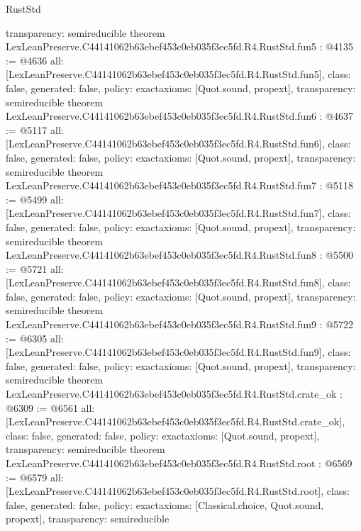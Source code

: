 \begin{lexlean}{RustStd}
\begin{coremodule}
{  transparency: semireducible
}
theorem LexLeanPreserve.C44141062b63ebef453c0eb035f3ec5fd.R4.RustStd.fun5 : @4135 := @4636 {
  all: [LexLeanPreserve.C44141062b63ebef453c0eb035f3ec5fd.R4.RustStd.fun5],
  class: false,
  generated: false,
  policy: exact{axioms: [Quot.sound, propext]},
  transparency: semireducible
}
theorem LexLeanPreserve.C44141062b63ebef453c0eb035f3ec5fd.R4.RustStd.fun6 : @4637 := @5117 {
  all: [LexLeanPreserve.C44141062b63ebef453c0eb035f3ec5fd.R4.RustStd.fun6],
  class: false,
  generated: false,
  policy: exact{axioms: [Quot.sound, propext]},
  transparency: semireducible
}
theorem LexLeanPreserve.C44141062b63ebef453c0eb035f3ec5fd.R4.RustStd.fun7 : @5118 := @5499 {
  all: [LexLeanPreserve.C44141062b63ebef453c0eb035f3ec5fd.R4.RustStd.fun7],
  class: false,
  generated: false,
  policy: exact{axioms: [Quot.sound, propext]},
  transparency: semireducible
}
theorem LexLeanPreserve.C44141062b63ebef453c0eb035f3ec5fd.R4.RustStd.fun8 : @5500 := @5721 {
  all: [LexLeanPreserve.C44141062b63ebef453c0eb035f3ec5fd.R4.RustStd.fun8],
  class: false,
  generated: false,
  policy: exact{axioms: [Quot.sound, propext]},
  transparency: semireducible
}
theorem LexLeanPreserve.C44141062b63ebef453c0eb035f3ec5fd.R4.RustStd.fun9 : @5722 := @6305 {
  all: [LexLeanPreserve.C44141062b63ebef453c0eb035f3ec5fd.R4.RustStd.fun9],
  class: false,
  generated: false,
  policy: exact{axioms: [Quot.sound, propext]},
  transparency: semireducible
}
theorem LexLeanPreserve.C44141062b63ebef453c0eb035f3ec5fd.R4.RustStd.crate_ok : @6309 := @6561 {
  all: [LexLeanPreserve.C44141062b63ebef453c0eb035f3ec5fd.R4.RustStd.crate_ok],
  class: false,
  generated: false,
  policy: exact{axioms: [Quot.sound, propext]},
  transparency: semireducible
}
theorem LexLeanPreserve.C44141062b63ebef453c0eb035f3ec5fd.R4.RustStd.root : @6569 := @6579 {
  all: [LexLeanPreserve.C44141062b63ebef453c0eb035f3ec5fd.R4.RustStd.root],
  class: false,
  generated: false,
  policy: exact{axioms: [Classical.choice, Quot.sound, propext]},
  transparency: semireducible
}


\end{coremodule}
\end{lexlean}
